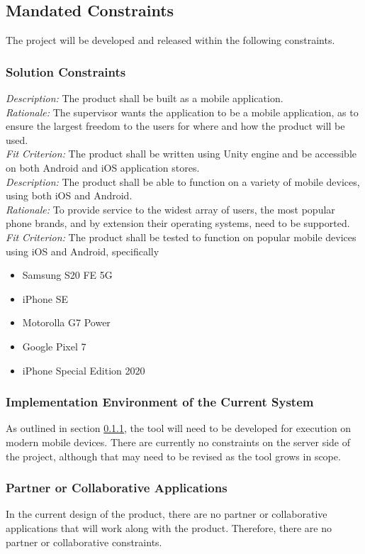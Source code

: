 \documentclass[12pt]{article}
\begin{document}
\subsection{Mandated Constraints}
The project will be developed and released within the following constraints. 

\subsubsection{Solution Constraints} \label{SolutionConstraints}
\emph{Description:} The product shall be built as a mobile application.\\
\emph{Rationale:} The supervisor wants the application to be a mobile application, as to ensure the largest freedom to the users for where and how the product will be used.\\
\emph{Fit Criterion:} The product shall be written using Unity engine and be accessible on both Android and iOS application stores.\\

\noindent
\emph{Description:} The product shall be able to function on a variety of mobile devices, using both iOS and Android.\\
\emph{Rationale:} To provide service to the widest array of users, the most popular phone brands, and by extension their operating systems, need to be supported.\\
\emph{Fit Criterion:} The product shall be tested to function on popular mobile devices using iOS and Android, specifically 
\begin{itemize}
	\item Samsung S20 FE 5G
    \item iPhone SE
    \item Motorolla G7 Power
    \item Google Pixel 7
    \item iPhone Special Edition 2020
\end{itemize}

\subsubsection{Implementation Environment of the Current System}
As outlined in section \ref{SolutionConstraints}, the tool will need to be developed for execution on modern mobile devices. There are currently no constraints on the server side of the project, although that may need to be revised as the tool grows in scope. 

\subsubsection{Partner or Collaborative Applications}
In the current design of the product, there are no partner or collaborative applications that will
work along with the product. Therefore, there are no partner or collaborative constraints.
\end{document}
